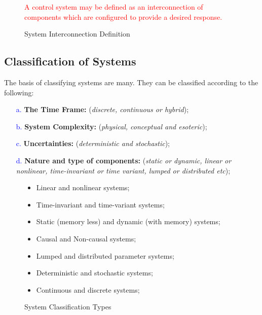 \documentclass[../notes-main.tex]{subfiles}
\begin{document}
\vspace{-1em}
\begin{figure}[H]
    \centering
    \begin{mdframed}
        \begin{center}
            \textcolor{red}{%
                A control system may be defined as an interconnection of components which are configured to provide a desired response.}
        \end{center}
    \end{mdframed}\label{fig:system-interconnect-def-1}
    \vspace{-1em}\caption{System Interconnection Definition}
\end{figure}
\subsection{Classification of Systems}
The basis of classifying systems are many. They can be classified according to the following:
\begin{itemize}
    \item[\textcolor{blue}{a.}] \textbf{The Time Frame:} (\emph{discrete, continuous or hybrid});
    \item[\textcolor{blue}{b.}] \textbf{System Complexity:} (\emph{physical, conceptual and esoteric});
    \item[\textcolor{blue}{c.}] \textbf{Uncertainties:} (\emph{deterministic and stochastic});
    \item[\textcolor{blue}{d.}] \textbf{Nature and type of components:} (\emph{static or dynamic, linear or nonlinear, time-invariant or time variant, lumped or distributed etc});
\end{itemize}
\begin{figure}[H]
    \centering
    \begin{mdframed}
        \begin{itemize}
            \item Linear and nonlinear systems;
            \item Time-invariant and time-variant systems;
            \item Static (memory less) and dynamic (with memory) systems;
            \item Causal and Non-causal systems;
            \item Lumped and distributed parameter systems;
            \item Deterministic and stochastic systems;
            \item Continuous and discrete systems;
        \end{itemize}
    \end{mdframed}\label{fig:system-type-list-1}
    \vspace{-1em}\caption{System Classification Types}
\end{figure}
\vspace{-1em}
\end{document}
